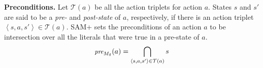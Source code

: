 \documentclass[letterpaper]{article} %
\newcommand{\pre}{\textit{pre}}
\newcommand{\tuple}[1]{\ensuremath{\left \langle #1 \right \rangle }}
\begin{document}
\noindent \textbf{Preconditions.} 
Let $\mathcal{T}(a)$ be all the action triplets for action $a$. 
States $s$ and $s'$ are said to be a \emph{pre-} and \emph{post-state} of $a$, respectively, if there is an action triplet $\tuple{s,a,s'}\in \mathcal{T}(a)$. 
SAM+ sets the preconditions of an action $a$ to be intersection over all the literals that were true in a pre-state of $a$. 
\begin{equation}
\small
        \pre_{M_\delta}(a) =  \bigcap_{\tuple{s, a, s'}\in \mathcal{T}(a)} s \label{eq:pre} 
\end{equation}        





\end{document}
